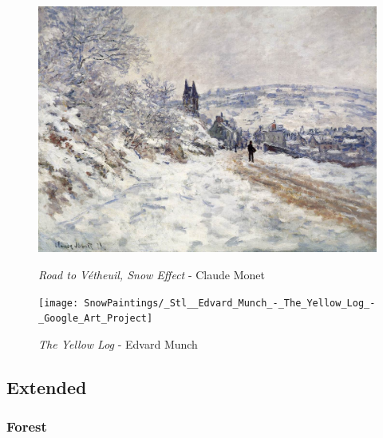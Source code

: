\documentclass[a4paper]{article}
\begin{document}
\begin {figure}[h!]
\centering
\begin{minipage}[b]{.49\textwidth}
	\centering
	\includegraphics[width=\textwidth]{SnowPaintings/_Stl__Road_to_V_theuil__Snow_Effect_-_Monet.jpg}
    \caption{\emph{Road to Vétheuil, Snow Effect} - Claude Monet}
\end{minipage}
\hfill
\begin{minipage}[b]{.49\textwidth}
	\centering
	\texttt{[image: SnowPaintings/\_Stl\_\_Edvard\_Munch\_-\_The\_Yellow\_Log\_-\_Google\_Art\_Project]}
    \caption{\emph{The Yellow Log} - Edvard Munch}
\end{minipage}
\end{figure}


\newpage
\subsection{Extended}
\subsubsection{Forest}
\end{document}
